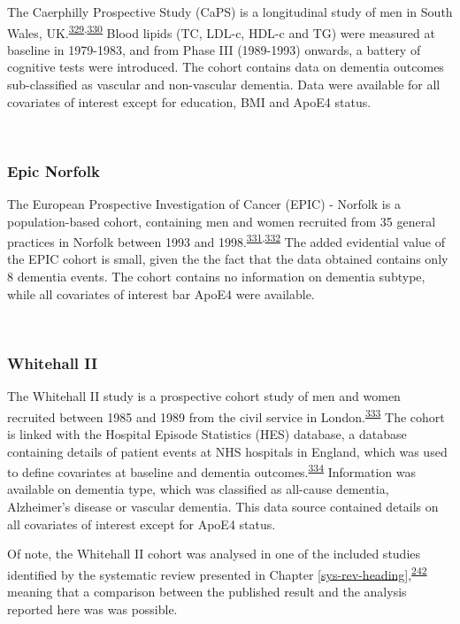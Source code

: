 \documentclass[a4paper, twoside]{templates/ociamthesis}
\begin{document}
The Caerphilly Prospective Study (CaPS) is a longitudinal study of men in South Wales, UK.\textsuperscript{\protect\hyperlink{ref-zotero-15398}{329},\protect\hyperlink{ref-elwood2013}{330}} Blood lipids (TC, LDL-c, HDL-c and TG) were measured at baseline in 1979-1983, and from Phase III (1989-1993) onwards, a battery of cognitive tests were introduced. The cohort contains data on dementia outcomes sub-classified as vascular and non-vascular dementia. Data were available for all covariates of interest except for education, BMI and ApoE4 status.

~

\hypertarget{epic-norfolk}{%
\subsubsection{Epic Norfolk}\label{epic-norfolk}}

The European Prospective Investigation of Cancer (EPIC) - Norfolk is a population-based cohort, containing men and women recruited from 35 general practices in Norfolk between 1993 and 1998.\textsuperscript{\protect\hyperlink{ref-riboli1997}{331},\protect\hyperlink{ref-riboli2002}{332}} The added evidential value of the EPIC cohort is small, given the the fact that the data obtained contains only 8 dementia events. The cohort contains no information on dementia subtype, while all covariates of interest bar ApoE4 were available.

~

\hypertarget{whitehall-ii}{%
\subsubsection{Whitehall II}\label{whitehall-ii}}

The Whitehall II study is a prospective cohort study of men and women recruited between 1985 and 1989 from the civil service in London.\textsuperscript{\protect\hyperlink{ref-marmot2005}{333}} The cohort is linked with the Hospital Episode Statistics (HES) database, a database containing details of patient events at NHS hospitals in England, which was used to define covariates at baseline and dementia outcomes.\textsuperscript{\protect\hyperlink{ref-zotero-15403}{334}} Information was available on dementia type, which was classified as all-cause dementia, Alzheimer's disease or vascular dementia. This data source contained details on all covariates of interest except for ApoE4 status.

Of note, the Whitehall II cohort was analysed in one of the included studies identified by the systematic review presented in Chapter \ref{sys-rev-heading},\textsuperscript{\protect\hyperlink{ref-tynkkynen2018}{242}} meaning that a comparison between the published result and the analysis reported here was was possible.
\end{document}
